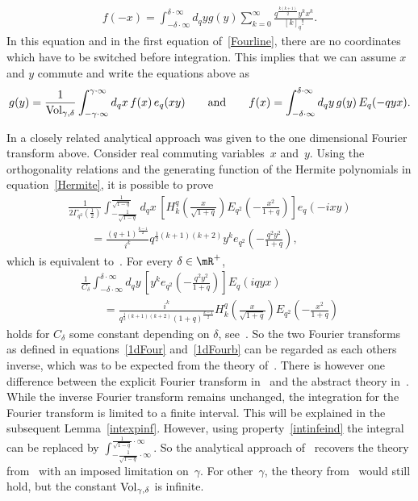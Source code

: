 \begin{gather*}
f(-x) = \int_{-\delta\cdot\infty}^{\delta\cdot\infty}d_qyg(y)\sum_{k=0}^\infty\frac{q^{\frac{k(k+1)}{2}}y^kx^k}{[k]_q!}.
\end{gather*}
In this equation and in the f\/irst equation of~\eqref{Fourline}, there are no coordinates which have to be switched before integration. This implies that we can assume $x$ and $y$ commute and write the equations above as
\begin{gather*}
g(y)=\frac{1}{{\rm Vol}_{\gamma,\delta}}\int_{-\gamma\cdot\infty}^{\gamma\cdot\infty}d_qx\,f(x)\,e_q(xy)\qquad \mbox{and}\qquad f(x)=\int_{-\delta\cdot\infty}^{\delta\cdot\infty}d_qy\,g(y)\,E_q(-qyx).
\end{gather*}



In \cite{MR1448685} a closely related analytical approach was given to the one dimensional Fourier transform above. Consider real commuting variables~$x$ and~$y$. Using the orthogonality relations and the generating function of the Hermite polynomials in equation~\eqref{Hermite}, it is possible to prove
\begin{gather}
\frac{1}{2\Gamma_{q^2}(\frac{1}{2})}\int_{-\frac{1}{\sqrt{1-q}}}^{\frac{1}{\sqrt{1-q}}}d_qx\, \left[H_k^q\left(\frac{x}{\sqrt{1+q}}\right)E_{q^2}\left(-\frac{x^2}{1+q}\right)\right]e_q(-ixy)\nonumber\\
\qquad{}
=\frac{(q+1)^{\frac{k-1}{2}}}{i^k}q^{\frac{1}{2}(k+1)(k+2)}y^ke_{q^2}\left(-\frac{q^2y^2}{1+q}\right),\label{1dFour}
\end{gather}
which is equivalent to~\cite[equation~(8.7)]{MR1448685}. For every $\delta\in\mR^+$,
\begin{gather}
\frac{1}{C_\delta}\int_{-\delta\cdot\infty}^{\delta\cdot\infty}d_qy\, \left[y^ke_{q^2}\left(-\frac{q^2y^2}{1+q}\right)\right]E_q(iqyx)\nonumber\\
\qquad =\frac{i^k}{q^{\frac{1}{2}(k+1)(k+2)}(1+q)^{\frac{k-1}{2}}}H_k^q\left(\frac{x}{\sqrt{1+q}}\right)E_{q^2}\left(-\frac{x^2}{1+q}\right)\label{1dFourb}
\end{gather}
holds for $C_\delta$ some constant depending on $\delta$, see~\cite[equation~(8.21)]{MR1448685}. So the two Fourier transforms as def\/ined in equations~\eqref{1dFour} and~\eqref{1dFourb} can be regarded as each others inverse, which was to be expected from the theory of~\cite{MR1303081}. There is however one dif\/ference between the explicit Fourier transform in~\cite{MR1448685} and the abstract theory in~\cite{MR1303081}. While the inverse Fourier transform remains unchanged, the integration for the Fourier transform is limited to a f\/inite interval. This will be explained in the subsequent Lemma~\ref{intexpinf}. However, using property~\eqref{intinfeind} the integral can be replaced by $\int_{-\frac{1}{\sqrt{1-q}}\cdot\infty}^{\frac{1}{\sqrt{1-q}}\cdot\infty}$. So the analytical approach of~\cite{MR1448685} recovers the theory from~\cite{MR1303081} with an imposed limitation on~$\gamma$. For other~$\gamma$, the theory from~\cite{MR1303081} would still hold, but the constant ${\rm Vol}_{\gamma,\delta}$ is inf\/inite.



